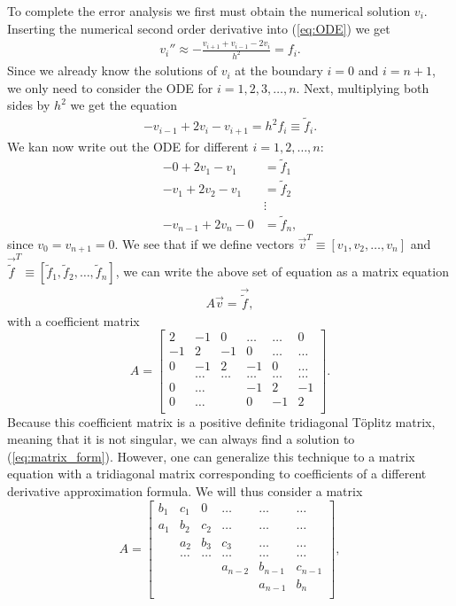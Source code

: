 \documentclass[twocolumn]{aastex62}
\begin{document}
To complete the error analysis we first must obtain the numerical solution $v_i$. Inserting the numerical second order derivative into (\ref{eq:ODE}) we get 
\begin{align}
	v_i''\approx -\frac{v_{i+1} + v_{i-1} - 2v_i}{h^2} = f_i.
\end{align}
Since we already know the solutions of $v_i$ at the boundary $i = 0$ and $i = n+1$, we only need to consider the ODE for $i = 1, 2, 3, \ldots, n$.
Next, multiplying both sides by $h^2$ we get the equation
\begin{align}
	-v_{i-1}  + 2v_i - v_{i+1} = h^2f_i\equiv \tilde{f}_i.
\end{align}
We kan now write out the ODE for different $i = 1, 2, \ldots, n$: 
\begin{align*}
	-0 + 2v_1 - v_1 &= \tilde{f}_1\\
	-v_1 + 2v_2 - v_1 &= \tilde{f}_2\\
	&\vdots\\
	-v_{n-1} + 2v_n - 0 &= \tilde{f}_n,
\end{align*}
since $v_0 = v_{n+1} = 0$. We see that if we define vectors $\vec{v}^T \equiv [v_1, v_2, \ldots, v_n]$ and $\vec{\tilde{f}}^T \equiv [\tilde{f}_1, \tilde{f}_2, \ldots, \tilde{f}_n]$, we can write the above set of equation as a matrix equation 
\begin{align}
	A\vec{v} =  \vec{\tilde{f}}, 
	\label{eq:matrix_form}
\end{align}
with a coefficient matrix 
\[ A = 
\begin{bmatrix}
	2& -1& 0 &\dots   & \dots &0 \\
	-1 & 2 & -1 &0 &\dots &\dots \\
    0&-1 &2 & -1 & 0 & \dots \\
    & \dots   & \dots &\dots   &\dots & \dots \\
    0&\dots   &  &-1 &2& -1 \\
    0&\dots    &  & 0  &-1 & 2 \\
\end{bmatrix}.
\]
Because this coefficient matrix is a positive definite tridiagonal Töplitz matrix, meaning that it is not singular, we can always find a solution to (\ref{eq:matrix_form}). However, one can generalize this technique to a matrix equation with a tridiagonal matrix corresponding to coefficients of a different derivative approximation formula. We will thus consider a matrix 
\[A = 
\begin{bmatrix}
	b_1& c_1 & 0 &\dots   & \dots &\dots \\
	a_1 & b_2 & c_2 &\dots &\dots &\dots \\
	& a_2 & b_3 & c_3 & \dots & \dots \\
	& \dots   & \dots &\dots   &\dots & \dots \\
	&   &  &a_{n-2}  &b_{n-1}& c_{n-1} \\
	&    &  &   &a_{n-1} & b_n \\
\end{bmatrix},
\]
\end{document}
